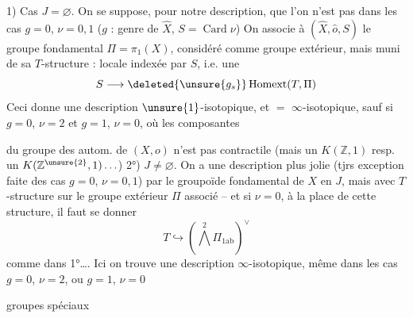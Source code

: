 1) Cas $J=\varnothing$.
On se suppose, pour
notre description, que l'on n'est
pas dans les cas $g=0$, $\nu=0,1$
($g$ : genre de $\widehat X$, $S=\operatorname{Card}\nu$)
On associe à $(\widehat X,\widehat o,S)$ le
groupe fondamental $\Pi=\pi_1(X)$, considéré
comme groupe extérieur, mais
muni de sa $T$-structure :
locale indexée par $S$, i.e. une
\[S\longrightarrow\deleted{\unsure{g_s}}\operatorname{Homext}(T,\Pi)\]
Ceci donne \inserted{$=$} une description
$\unsure{1}$-isotopique, et $=$ $\infty$-isotopique,
sauf si $g=0$, $\nu=2$ et $g=1$, $\nu=0$,
où les composantes 

 du groupe des autom. de $(X,o)$
n'est pas contractile (mais un
$K(\mathbb Z,1)$ resp. un $K(\mathbb Z^{\unsure{2}},1)\ldots$)
2°) $J\ne\varnothing$. On a une description
plus jolie (tjrs exception faite
des cas $g=0$, $\nu=0,1$) par le
groupoïde fondamental de $X$
en $J$, mais avec $T$-structure
 sur le groupe extérieur
$\Pi$ associé -- et si $\nu=0$, à la place de
cette structure, il faut se donner
\[T\hookrightarrow(\bigwedge^2\Pi_{1\mathrm{ab}})^\vee\]
comme dans 1°\ldots. Ici on trouve
une description $\infty$-isotopique, même
dans les cas $g=0$, $\nu=2$, ou $g=1$, $\nu=0$

groupes 
spéciaux

